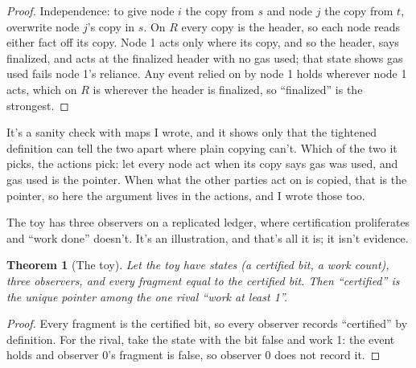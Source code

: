 \documentclass[11pt,twoside]{article}
\theoremstyle{thielethm}
\newtheorem{theorem}{Theorem}[section]
\theoremstyle{thieledef}
\theoremstyle{thieledef}
\theoremstyle{thieledef}
\theoremstyle{thielethm}
\theoremstyle{thieleobs}
\theoremstyle{thielethm}
\begin{document}
\begin{proof}
Independence: to give node $i$ the copy from $s$ and node $j$ the copy from $t$, overwrite node
$j$'s copy in $s$. On $R$ every copy is the header, so each node reads either fact off its copy.
Node 1 acts only where its copy, and so the header, says finalized, and acts at the finalized
header with no gas used; that state shows gas used fails node 1's reliance. Any event relied on by
node 1 holds wherever node 1 acts, which on $R$ is wherever the header is finalized, so
``finalized'' is the strongest.
\end{proof}

It's a sanity check with maps I wrote, and it shows only that the tightened definition can tell the two apart where plain copying can't. Which of the two it picks, the actions pick: let every node act when its copy says gas was used, and gas used is the pointer. When what the other parties act on is copied, that is the pointer, so here the argument lives in the actions, and I wrote those too.


The toy has three observers on a replicated ledger, where certification proliferates and ``work
done'' doesn't. It's an illustration, and that's all it is; it isn't evidence.

\begin{theorem}[The toy]\label{thm:u14-toy}
Let the toy have states (a certified bit, a work count), three observers, and every fragment
equal to the certified bit. Then ``certified'' is the unique pointer among the one rival
``work at least 1''.
\end{theorem}

\begin{proof}
Every fragment is the certified bit, so every observer records ``certified'' by definition.
For the rival, take the state with the bit false and work 1: the event holds and observer 0's
fragment is false, so observer 0 does not record it.
\end{proof}
\end{document}
